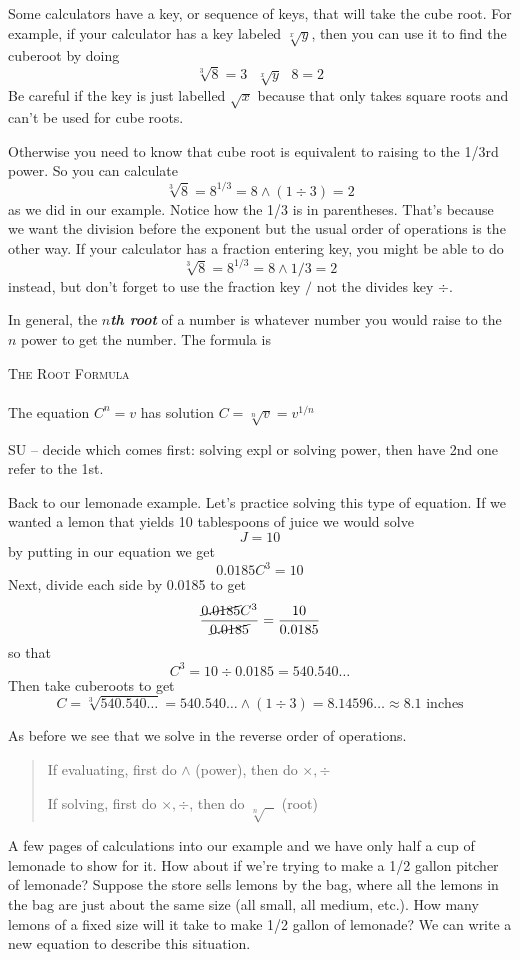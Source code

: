 Some calculators have a key, or sequence of keys, that will take the cube root.  For example, if your calculator has a key labeled $\sqrt[x]{y}$, then you can use it to find the cuberoot by doing $$\sqrt[3]{8}=3\text{ }\sqrt[x]{y}\text{ }8=2$$  Be careful if the key is just labelled $\sqrt{x}$ because that only takes square roots and can't be used for cube roots.

Otherwise you need to know that cube root is equivalent to raising to the 1/3rd power.  So you can calculate $$\sqrt[3]{8}=8^{1/3}=8\wedge(1\div3)=2$$ as we did in our example.  Notice how the 1/3 is in parentheses.  That's because we want the division before the exponent but the usual order of operations is the other way.  If your calculator has a fraction entering key, you might be able to do $$\sqrt[3]{8}=8^{1/3}=8\wedge1/3=2$$ instead, but don't forget to use the fraction key $/$ not the divides key $\div$.

In general, the \emph{\textbf{$n$th root}} of a number is whatever number you would raise to the $n$ power to get the number.  The formula is
\begin{center}
\textsc{The Root Formula} \\ ~\\
The equation $C^n=v$ has solution $C= \sqrt[n]{v} = v^{1/n}$
\end{center}

SU -- decide which comes first: solving expl or solving power, then have 2nd one refer to the 1st.

Back to our lemonade example.  Let's practice solving this type of equation.  If we wanted a lemon that yields 10 tablespoons of juice we would solve $$J=10$$ by putting in our equation we get $$0.0185C^3=10$$  Next, divide each side by 0.0185 to get $$\frac{\cancel{0.0185}C^3}{\cancel{0.0185}}=\frac{10}{0.0185}$$ so that $$C^3 = 10 \div 0.0185 = 540.540\ldots$$ Then take cuberoots to get $$C=\sqrt[3]{ 540.540\ldots} = 540.540\ldots\wedge(1 \div 3) = 8.14596\ldots \approx 8.1 \text{ inches}$$

As before we see that we solve in the reverse order of operations.
\begin{quote} If evaluating, first do $\wedge$ (power), then do $\times, \div$

If solving, first do $\times,\div$, then do $\sqrt[n]{\text{ }}$ (root)\end{quote}

A few pages of calculations into our example and we have only half a cup of lemonade to show for it. How about if we're trying to make a 1/2 gallon pitcher of lemonade?  Suppose the store sells lemons by the bag, where all the lemons in the bag are just about the same size (all small, all medium, etc.).  How many lemons of a fixed size will it take to make 1/2 gallon of lemonade?  We can write a new equation to describe this situation.

